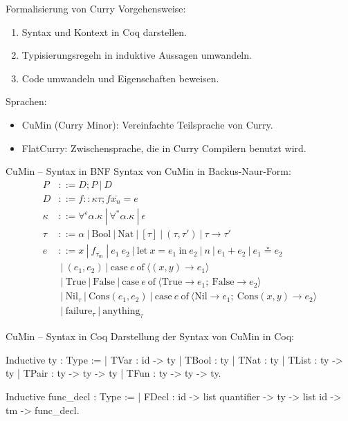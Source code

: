 \documentclass{beamer}
\begin{document}
\begin{frame}{Formalisierung von Curry}
Vorgehensweise:
\begin{enumerate}
	\item Syntax und Kontext in Coq darstellen.
	\item Typisierungsregeln in induktive Aussagen umwandeln.
	\item Code umwandeln und Eigenschaften beweisen.
\end{enumerate}
Sprachen:
\begin{itemize}
	\item CuMin (Curry Minor): Vereinfachte Teilsprache von Curry.
	\item FlatCurry: Zwischensprache, die in Curry Compilern benutzt wird.
\end{itemize}
\end{frame}
\begin{frame}{CuMin -- Syntax in BNF}
Syntax von CuMin in Backus-Naur-Form:
\begin{align*}
P &::= D;P \:|\:D \\
D &::= f :: \kappa \tau; f \overline{x_{n}} = e\\
\kappa &::= \forall^{\epsilon} \alpha.\kappa \:|\: \forall^{*}\alpha.\kappa \:|\: \epsilon \\
\tau &::= \alpha \:|\: \text{Bool} \:|\: \text{Nat} \:|\: [\tau] \:|\: (\tau,\tau ') \:|\: \tau \rightarrow \tau ' \\
e &::= x \:|\: f_{\overline{\tau_{m}}} \:|\: e_{1}\: e_{2} \:|\: \text{let}\: x = e_{1} \:\text{in}\: e_{2} \:|\: n \:|\: e_{1} + e_{2} \:|\: e_{1} \circeq e_{2}\\
&\:|\: (e_{1},e_{2}) \:|\: \text{case}\: e \:\text{of}\: \langle (x,y) \rightarrow e_{1}\rangle\\
&\:|\: \text{True} \:|\: \text{False} \:|\: \text{case}\: e \:\text{of}\: \langle \text{True} \rightarrow e_{1};\:\text{False} \rightarrow e_{2}\rangle\\
&\:|\: \text{Nil}_{\tau} \:|\: \text{Cons}(e_{1}, e_{2}) \:|\: \text{case}\: e \:\text{of}\: \langle \text{Nil} \rightarrow e_{1};\:\text{Cons}(x,y) \rightarrow e_{2}\rangle\\
&\:|\: \text{failure}_{\tau} \:|\: \text{anything}_{\tau}
\end{align*}
\end{frame}

\begin{frame}[fragile]{CuMin -- Syntax in Coq}
Darstellung der Syntax von CuMin in Coq:
\begin{coqcode}	
Inductive ty : Type :=
  | TVar  : id -> ty
  | TBool : ty
  | TNat  : ty
  | TList : ty -> ty
  | TPair : ty -> ty -> ty
  | TFun  : ty -> ty -> ty.

Inductive func_decl : Type :=
  | FDecl : id -> list quantifier -> ty ->
            list id -> tm -> func_decl.
\end{coqcode}
\end{frame}
\end{document}
